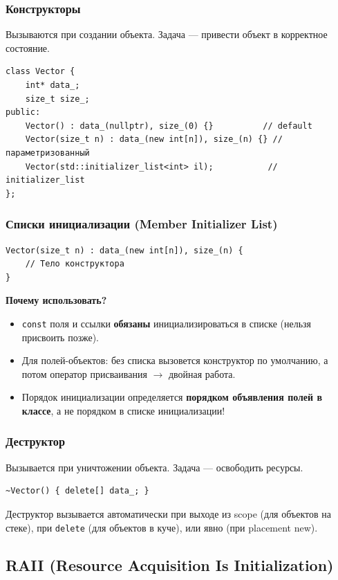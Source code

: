 \documentclass[12pt,a4paper]{article}
\begin{document}
\subsubsection{Конструкторы}
Вызываются при создании объекта. Задача --- привести объект в корректное состояние.

\begin{lstlisting}
class Vector {
    int* data_;
    size_t size_;
public:
    Vector() : data_(nullptr), size_(0) {}          // default
    Vector(size_t n) : data_(new int[n]), size_(n) {} // параметризованный
    Vector(std::initializer_list<int> il);           // initializer_list
};
\end{lstlisting}

\subsubsection{Списки инициализации (Member Initializer List)}
\begin{lstlisting}
Vector(size_t n) : data_(new int[n]), size_(n) {
    // Тело конструктора
}
\end{lstlisting}
\textbf{Почему использовать?}
\begin{itemize}
    \item \texttt{const} поля и ссылки \textbf{обязаны} инициализироваться в списке (нельзя присвоить позже).
    \item Для полей-объектов: без списка вызовется конструктор по умолчанию, а потом оператор присваивания $\to$ двойная работа.
    \item Порядок инициализации определяется \textbf{порядком объявления полей в классе}, а не порядком в списке инициализации!
\end{itemize}

\subsubsection{Деструктор}
Вызывается при уничтожении объекта. Задача --- освободить ресурсы.
\begin{lstlisting}
~Vector() { delete[] data_; }
\end{lstlisting}
Деструктор вызывается автоматически при выходе из scope (для объектов на стеке), при \texttt{delete} (для объектов в куче), или явно (при placement new).

\subsection{RAII (Resource Acquisition Is Initialization)}
\end{document}
